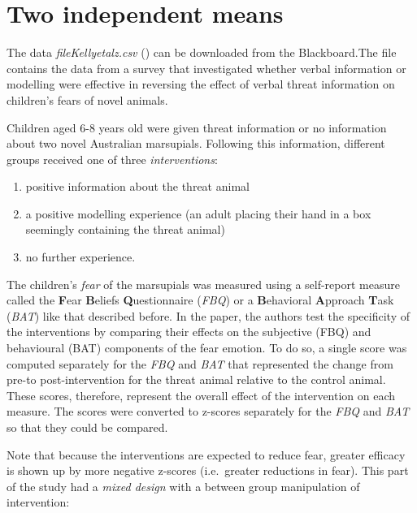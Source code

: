\documentclass[
]{article}
\providecommand{\tightlist}{%
  \setlength{\itemsep}{0pt}\setlength{\parskip}{0pt}}
\begin{document}
\section*{Two independent means}\label{two-independent-means}

The data \emph{fileKellyetalz.csv} () can be downloaded from the Blackboard.The file contains the data from a survey that investigated whether verbal information or modelling were effective in reversing the effect of verbal threat information on children's fears of novel animals.

Children aged 6-8 years old were given threat information or no information about two novel Australian marsupials. Following this information, different groups received one of three \emph{interventions}:

\begin{enumerate}
\def\labelenumi{\arabic{enumi}.}
\tightlist
\item
  positive information about the threat animal
\item
  a positive modelling experience (an adult placing their hand in a box seemingly containing the threat animal)
\item
  no further experience.
\end{enumerate}

The children's \emph{fear} of the marsupials was measured using a self-report measure called the \textbf{F}ear \textbf{B}eliefs \textbf{Q}uestionnaire (\emph{FBQ}) or a \textbf{B}ehavioral \textbf{A}pproach \textbf{T}ask (\emph{BAT}) like that described before. In the paper, the authors test the specificity of the interventions by comparing their effects on the subjective (FBQ) and behavioural (BAT) components of the fear emotion. To do so, a single score was computed separately for the \emph{FBQ} and \emph{BAT} that represented the change from pre-to post-intervention for the threat animal relative to the control animal. These scores, therefore, represent the overall effect of the intervention on each measure. The scores were converted to z-scores separately for the \emph{FBQ} and \emph{BAT} so that they could be compared.

Note that because the interventions are expected to reduce fear, greater efficacy is shown up by more negative z-scores (i.e.~greater reductions in fear). This part of the study had a \emph{mixed design} with a between group manipulation of intervention:
\end{document}
